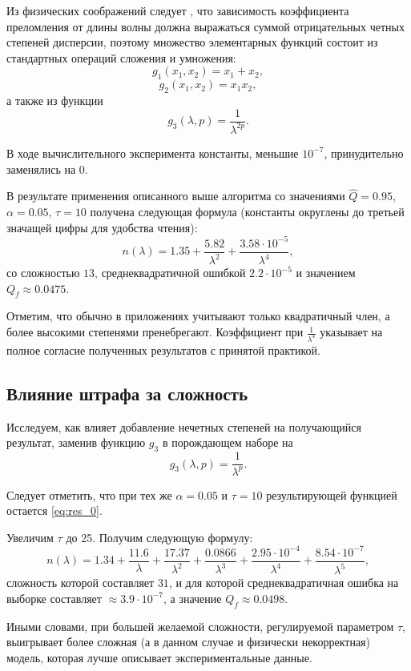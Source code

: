 \documentclass[12pt,a4paper]{article}
\begin{document}
Из физических соображений следует \cite{Serova11}, что зависимость коэффициента преломления
от длины волны должна выражаться суммой отрицательных четных степеней дисперсии,
поэтому множество элементарных функций состоит из стандартных операций сложения и умножения:
\[
  g_1(x_1, x_2) = x_1 + x_2,
\]
\[
  g_2(x_1, x_2) = x_1 x_2,
\]
а также из функции
\[
  g_3(\lambda, p) = \frac{1}{\lambda^{2p}}.
\]

В ходе вычислительного эксперимента константы, меньшие $10^{-7}$, принудительно
заменялись на $0$.

В результате применения описанного выше алгоритма со значениями
$\hat{Q} = 0.95$, $\alpha = 0.05$, $\tau = 10$ получена следующая формула
(константы округлены до третьей значащей цифры для удобства чтения):
\begin{equation}
  n(\lambda) = 1.35 + \frac{5.82}{\lambda^2} + \frac{3.58 \cdot 10^{-5}}{\lambda^4},
  \label{eq:res_0}
\end{equation}
со сложностью $13$, среднеквадратичной ошибкой $2.2 \cdot 10^{-5}$ и значением $Q_f \approx 0.0475$.

Отметим, что обычно в приложениях учитывают только квадратичный член, а более
высокими степенями пренебрегают. Коэффициент при $\frac{1}{\lambda^4}$ указывает
на полное согласие полученных результатов с принятой практикой.

\subsection{Влияние штрафа за сложность}

Исследуем, как влияет добавление нечетных степеней на получающийся результат,
заменив функцию $g_3$ в порождающем наборе на
\[
  g_3(\lambda, p) = \frac{1}{\lambda^p}.
\]

Следует отметить, что при тех же $\alpha = 0.05$ и $\tau = 10$ результирующей функцией остается
\eqref{eq:res_0}.

Увеличим $\tau$ до 25. Получим следующую формулу:
\begin{equation}
  n(\lambda) = 1.34 + \frac{11.6}{\lambda} + \frac{17.37}{\lambda^2} + \frac{0.0866}{\lambda^3} + \frac{2.95 \cdot 10^{-4}}{\lambda^4} + \frac{8.54 \cdot 10^{-7}}{\lambda^5},
  \label{eq:res_incorrect}
\end{equation}
сложность которой составляет $31$, и для которой среднеквадратичная ошибка
на выборке составляет $\approx 3.9 \cdot 10^{-7}$,
а значение $Q_f \approx 0.0498$.

Иными словами, при большей желаемой сложности,
регулируемой параметром $\tau$, выигрывает более сложная (а в данном случае и
физически некорректная) модель, которая лучше описывает экспериментальные данные.
\end{document}
